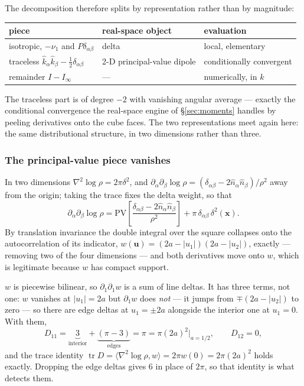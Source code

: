 \documentclass[11pt,a4paper]{article}
\begin{document}
The decomposition therefore splits by representation rather than by magnitude:

\begin{center}
\begin{tabular}{lll}
\toprule
piece & real-space object & evaluation\\
\midrule
isotropic, $-\nu_1$ and $P\delta_{\alpha\beta}$ & delta & local, elementary\\
traceless $\hat{k}_\alpha\hat{k}_\beta - \tfrac12\delta_{\alpha\beta}$
  & 2-D principal-value dipole & conditionally convergent\\
remainder $I - I_\infty$ & --- & numerically, in $k$\\
\bottomrule
\end{tabular}
\end{center}

The traceless part is of degree $-2$ with vanishing angular average --- exactly
the conditional convergence the real-space engine of \S\ref{sec:moments} handles
by peeling derivatives onto the cube faces.  The two representations meet again
here: the same distributional structure, in two dimensions rather than three.

\subsubsection{The principal-value piece vanishes}

In two dimensions $\nabla^2\log\rho = 2\pi\delta^2$, and
$\partial_\alpha\partial_\beta\log\rho = (\delta_{\alpha\beta} -
2\hat{n}_\alpha\hat{n}_\beta)/\rho^2$ away from the origin; taking the trace
fixes the delta weight, so that
\begin{equation}\label{eq:pvsplit}
  \partial_\alpha\partial_\beta\log\rho
  = \mathrm{PV}\!\left[\frac{\delta_{\alpha\beta}
      - 2\hat{n}_\alpha\hat{n}_\beta}{\rho^{2}}\right]
    + \pi\,\delta_{\alpha\beta}\,\delta^{2}(\mathbf{x}) .
\end{equation}
By translation invariance the double integral over the square collapses onto the
autocorrelation of its indicator, $w(\mathbf{u}) = (2a-|u_1|)(2a-|u_2|)$, exactly
--- removing two of the four dimensions --- and both derivatives move onto $w$,
which is legitimate because $w$ has compact support.

$w$ is piecewise bilinear, so $\partial_1\partial_1 w$ is a sum of line deltas.
It has three terms, not one: $w$ vanishes at $|u_1| = 2a$ but
$\partial_1 w$ does \emph{not} --- it jumps from $\mp(2a-|u_2|)$ to zero --- so
there are edge deltas at $u_1 = \pm2a$ alongside the interior one at $u_1 = 0$.
With them,
\begin{equation}\label{eq:Dab}
  D_{11} = \underbrace{3}_{\text{interior}} + \underbrace{(\pi-3)}_{\text{edges}}
         = \pi = \pi(2a)^2 \Big|_{a=1/2},
  \qquad D_{12} = 0 ,
\end{equation}
and the trace identity $\operatorname{tr}D = \langle\nabla^2\log\rho, w\rangle =
2\pi w(0) = 2\pi(2a)^2$ holds exactly.  Dropping the edge deltas gives $6$ in
place of $2\pi$, so that identity is what detects them.
\end{document}
